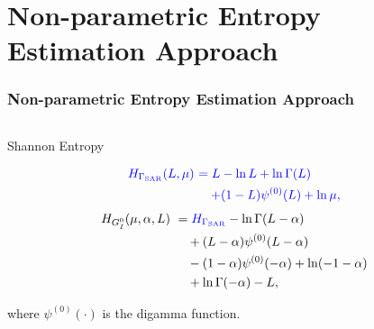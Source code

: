 \documentclass[aspectratio=169,10pt]{beamer}
\begin{document}
\section{Non-parametric Entropy Estimation Approach}
\begin{frame} \frametitle{\large{Non-parametric Entropy Estimation Approach}}\vspace{0.4cm}	

 \justifying
\begin{columns}[T,onlytextwidth]
    \begin{column}{.45\textwidth}
			\begin{block}{Shannon Entropy}\justifying
 
\begin{small}
\begin{align*}
 \textcolor[rgb]{0,0,1}{H_{\Gamma_{\text{SAR}}}(L, \mu)} \ &\textcolor[rgb]{0,0,1}{  =  L -\ln L+\ln\Gamma(L)}\\
& \textcolor[rgb]{0,0,1}{\quad +(1-L)\psi^{(0)}(L) + \ln \mu, }
\end{align*} 
\begin{align*}
H_{G_I^0}(\mu, \alpha, L) \ &=\textcolor[rgb]{0,0,1}{ H_{\Gamma_{\text{SAR}}}} -\ln\Gamma(L-\alpha)\\
&\quad + (L-\alpha) \psi^{(0)}(L-\alpha)\\
&\quad -(1-\alpha)\psi^{(0)}(-\alpha)+\ln (-1-\alpha)\\
&\quad+\ln\Gamma(-\alpha)-L,
\end{align*}
\end{small}
where \(\psi^{(0)}(\cdot)\) is the digamma function.
		\end{block}
    \end{column}
		

\end{columns}
\end{frame}
\end{document}

